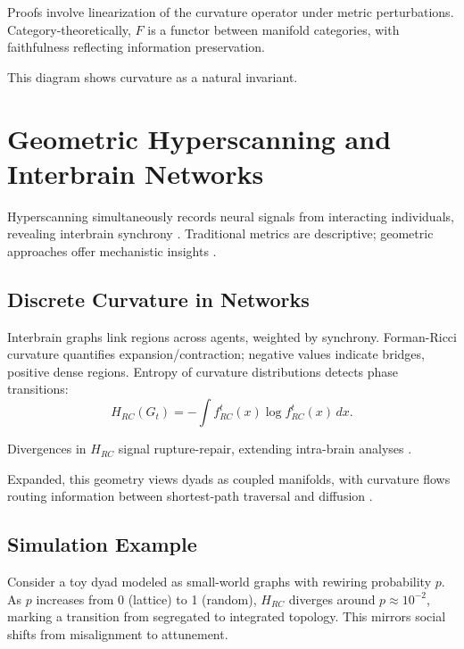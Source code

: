 \documentclass{article}
\theoremstyle{definition}
\begin{document}
Proofs involve linearization of the curvature operator under metric perturbations. Category-theoretically, $F$ is a functor between manifold categories, with faithfulness reflecting information preservation.


This diagram shows curvature as a natural invariant.

\section{Geometric Hyperscanning and Interbrain Networks}

Hyperscanning simultaneously records neural signals from interacting individuals, revealing interbrain synchrony \cite{montague2002hyperscanning}. Traditional metrics are descriptive; geometric approaches offer mechanistic insights \cite{hinrichs2025geometry}.

\subsection{Discrete Curvature in Networks}

Interbrain graphs link regions across agents, weighted by synchrony. Forman-Ricci curvature quantifies expansion/contraction; negative values indicate bridges, positive dense regions. Entropy of curvature distributions detects phase transitions:
\[
H_{RC}(G_t) = -\int f^t_{RC}(x) \log f^t_{RC}(x) \, dx.
\]

Divergences in $H_{RC}$ signal rupture-repair, extending intra-brain analyses \cite{weber2019curvature,chatterjee2021detecting}.

Expanded, this geometry views dyads as coupled manifolds, with curvature flows routing information between shortest-path traversal and diffusion \cite{avena2019spectrum}.

\subsection{Simulation Example}

Consider a toy dyad modeled as small-world graphs with rewiring probability $p$. As $p$ increases from 0 (lattice) to 1 (random), $H_{RC}$ diverges around $p \approx 10^{-2}$, marking a transition from segregated to integrated topology. This mirrors social shifts from misalignment to attunement.
\end{document}
